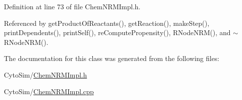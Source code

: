 Definition at line 73 of file Chem\-N\-R\-M\-Impl.\-h.



Referenced by get\-Product\-Of\-Reactants(), get\-Reaction(), make\-Step(), print\-Dependents(), print\-Self(), re\-Compute\-Propensity(), R\-Node\-N\-R\-M(), and $\sim$\-R\-Node\-N\-R\-M().



The documentation for this class was generated from the following files\-:\begin{DoxyCompactItemize}
\item 
Cyto\-Sim/\hyperlink{ChemNRMImpl_8h}{Chem\-N\-R\-M\-Impl.\-h}\item 
Cyto\-Sim/\hyperlink{ChemNRMImpl_8cpp}{Chem\-N\-R\-M\-Impl.\-cpp}\end{DoxyCompactItemize}
